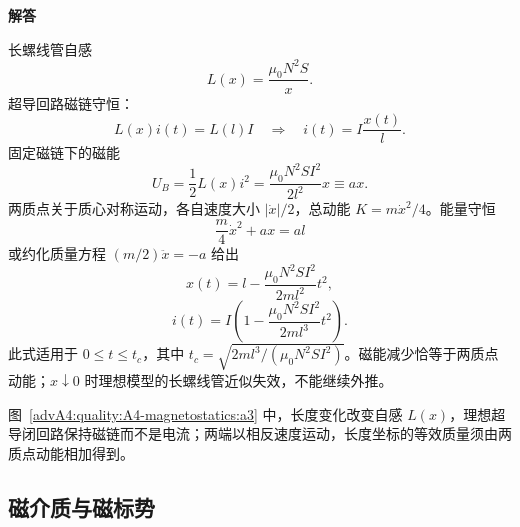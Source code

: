 \begin{advsolution}
\begin{center}\begin{minipage}{.96\linewidth}\centering
\raggedright{\bfseries\color{DeepBlue}解答}\par\smallskip\centering

\label{advA4:quality:A4-magnetostatics:a3}
\end{minipage}\end{center}

长螺线管自感
\[
 L(x)=\frac{\mu_0N^2S}{x}.
\]
超导回路磁链守恒：
\[
 L(x)i(t)=L(l)I
 \quad\Longrightarrow\quad
 \boxed{i(t)=I\frac{x(t)}l}.
\]
固定磁链下的磁能
\[
 U_B=\frac12L(x)i^2
 =\frac{\mu_0N^2SI^2}{2l^2}x\equiv ax.
\]
两质点关于质心对称运动，各自速度大小 $|\dot x|/2$，总动能
$K=m\dot x^2/4$。能量守恒
\[
 \frac m4\dot x^2+ax=al
\]
或约化质量方程 $(m/2)\ddot x=-a$ 给出
\[
 \boxed{x(t)=l-\frac{\mu_0N^2SI^2}{2ml^2}t^2},
\]
\[
 \boxed{i(t)=I\left(1-\frac{\mu_0N^2SI^2}{2ml^3}t^2\right)}.
\]
此式适用于 $0\le t\le t_c$，其中
$t_c=\sqrt{2ml^3/(\mu_0N^2SI^2)}$。磁能减少恰等于两质点动能；$x\downarrow0$ 时理想模型的长螺线管近似失效，不能继续外推。

图~\ref{advA4:quality:A4-magnetostatics:a3} 中，长度变化改变自感 $L(x)$，理想超导闭回路保持磁链而不是电流；两端以相反速度运动，长度坐标的等效质量须由两质点动能相加得到。
\end{advsolution}

\subsection{磁介质与磁标势}



